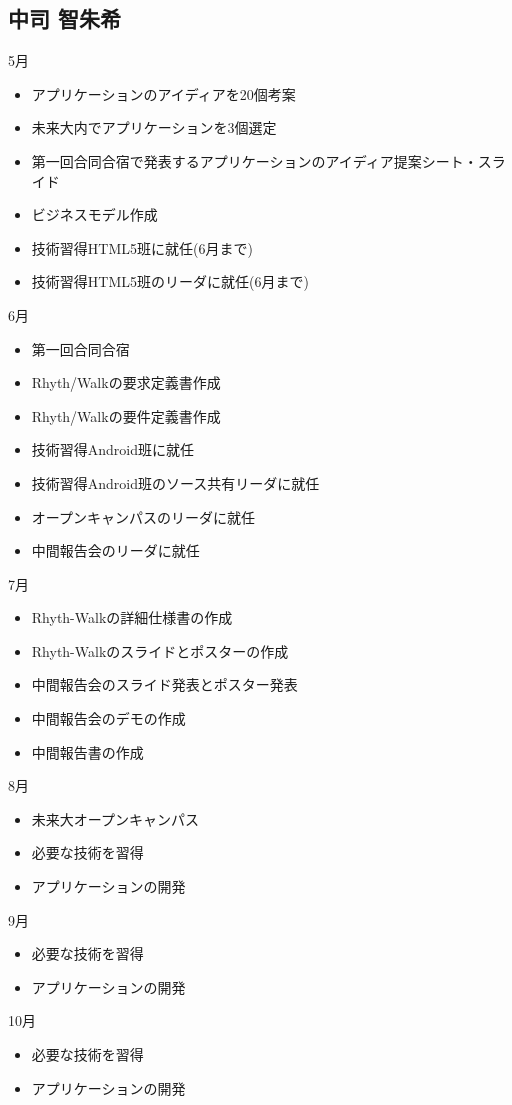 \subsection{中司 智朱希}

5月
\begin{itemize}
\item アプリケーションのアイディアを20個考案
\item 未来大内でアプリケーションを3個選定
\item 第一回合同合宿で発表するアプリケーションのアイディア提案シート・スライド\item ビジネスモデル作成
\item 技術習得HTML5班に就任(6月まで)
\item 技術習得HTML5班のリーダに就任(6月まで)
\end{itemize}
6月
\begin{itemize}
\item 第一回合同合宿
\item Rhyth/Walkの要求定義書作成
\item Rhyth/Walkの要件定義書作成
\item 技術習得Android班に就任
\item 技術習得Android班のソース共有リーダに就任
\item オープンキャンパスのリーダに就任
\item 中間報告会のリーダに就任
\end{itemize}
7月
\begin{itemize}
\item Rhyth-Walkの詳細仕様書の作成
\item Rhyth-Walkのスライドとポスターの作成
\item 中間報告会のスライド発表とポスター発表
\item 中間報告会のデモの作成
\item 中間報告書の作成
\end{itemize}
8月
\begin{itemize}
\item 未来大オープンキャンパス
\item 必要な技術を習得
\item アプリケーションの開発
\end{itemize}
9月
\begin{itemize}
\item 必要な技術を習得
\item アプリケーションの開発
\end{itemize}
10月
\begin{itemize}
\item 必要な技術を習得
\item アプリケーションの開発
\end{itemize}
